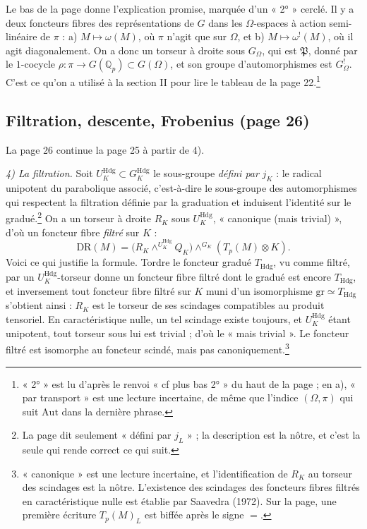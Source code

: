 \documentclass[11pt,a4paper]{article}
\begin{document}
Le bas de la page donne l'explication promise, marquée d'un « 2° » cerclé. Il
y a deux foncteurs fibres des représentations de $G$ dans les $\Omega$-espaces
à action semi-linéaire de $\pi$ : a) $M \mapsto \omega(M)$, où $\pi$ n'agit que
sur $\Omega$, et b) $M \mapsto \omega^{!}(M)$, où il agit diagonalement. On a
donc un torseur à droite sous $G_{\Omega}$, qui est $\mathfrak{P}$, donné par
le $1$-cocycle $\rho : \pi \to G(\mathbb{Q}_p) \subset G(\Omega)$, et son
groupe d'automorphismes est $G^{!}_{\Omega}$. C'est ce qu'on a utilisé à la
section II pour lire le tableau de la page 22.\footnote{« 2° » est lu d'après
le renvoi « cf plus bas 2° » du haut de la page ; en a), « par transport » est
une lecture incertaine, de même que l'indice $(\Omega, \pi)$ qui suit
$\mathrm{Aut}$ dans la dernière phrase.}

\subsection*{Filtration, descente, Frobenius (page 26)}

La page 26 continue la page 25 à partir de 4).

\emph{4) La filtration.} Soit $U^{\mathrm{Hdg}}_K \subset G^{\mathrm{Hdg}}_K$ le
sous-groupe \emph{défini par} $j_K$ : le radical unipotent du parabolique
associé, c'est-à-dire le sous-groupe des automorphismes qui respectent la
filtration définie par la graduation et induisent l'identité sur le
gradué.\footnote{La page dit seulement « défini par $j_L$ » ; la description
est la nôtre, et c'est la seule qui rende correct ce qui suit.} On a un
torseur à droite $R_K$ sous $U^{\mathrm{Hdg}}_K$, « canonique (mais
trivial) », d'où un foncteur fibre \emph{filtré} sur $K$ :
\[
\mathrm{DR}(M) = \bigl(R_K \wedge^{U^{\mathrm{Hdg}}_K} Q_K\bigr)
\wedge^{G_K} (T_p(M) \otimes K).
\]
Voici ce qui justifie la formule. Tordre le foncteur gradué
$T_{\mathrm{Hdg}}$, vu comme filtré, par un $U^{\mathrm{Hdg}}_K$-torseur donne
un foncteur fibre filtré dont le gradué est encore $T_{\mathrm{Hdg}}$, et
inversement tout foncteur fibre filtré sur $K$ muni d'un isomorphisme
$\mathrm{gr} \simeq T_{\mathrm{Hdg}}$ s'obtient ainsi : $R_K$ est le torseur
de ses scindages compatibles au produit tensoriel. En caractéristique nulle,
un tel scindage existe toujours, et $U^{\mathrm{Hdg}}_K$ étant unipotent, tout
torseur sous lui est trivial ; d'où le « mais trivial ». Le foncteur filtré
est isomorphe au foncteur scindé, mais pas canoniquement.\footnote{« canonique »
est une lecture incertaine, et l'identification de $R_K$ au torseur des
scindages est la nôtre. L'existence des scindages des foncteurs fibres filtrés
en caractéristique nulle est établie par Saavedra (1972). Sur la page, une
première écriture $T_p(M)_L$ est biffée après le signe $=$.}
\end{document}
